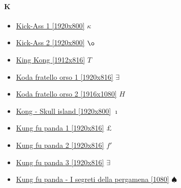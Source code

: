 	\paragraph{K} \hypertarget{FIK}{}
		\begin{itemize}
		
			\item \href{https://mega.nz/#!GEwF1L6R!W4WbCgZw3aRAoZ828tgjJndzR6XEimmqf2Q4RMw4oWI} {Kick-Ass 1 [1920x800]}  $\kappa$ \\ 
			\item \href{https://mega.nz/#!Ykhh1KJB!9V33UqaCIwPpCGVPaE6iOQ09sIMKAzOqsIhYFVmjNm4} {Kick-Ass 2 [1920x800]}  $\o$ \\
			\item \href{https://mega.nz/#!VzwUwBbI!AM4eVGaxxsFD72PdYyLg4AP1rIyJ1kG5UOyUPQO_D70} {King Kong [1912x816]}  $T$ \\
			\item \href{https://mega.nz/#!mr4zya5b!RWvevrKp2qDyORqVVw36BdhZYM0Boinb8SW2wSH-pTc} {Koda fratello orso 1 [1920x816]}  $\exists$ \\
			\item \href{https://mega.nz/#!fwJyAAyQ!Cy4LGoOjiMtzuqDIgj3vuU0gbHM-aa_GD2MlwqR_br0} {Koda fratello orso 2 [1916x1080]}  $H$ \\
			\item \href{https://mega.nz/#!vygSRTxD!46KDE7cMe-eWOofKeW_4zgH-nGmEXDo4a1Sw5aq2-IA} {Kong - Skull island [1920x800]}  $\imath$ \\
			\item \href{https://mega.nz/#!TnBGjDgD!2Cj5VHzMkK8d-JN1TYX_exFPElf9lmODJUn7H05qxxQ} {Kung fu panda 1 [1920x816]}  $\pounds$ \\
			\item \href{https://mega.nz/#!HyxHGKiI!v4WIKM9hrVQsruzz-N1ljUHKWrooZC8sJyPvm-p3_VU} {Kung fu panda 2 [1920x816]}  $f'$ \\
			\item \href{https://mega.nz/#!6vhzFQaQ!I3bFf2VR7BhtZWvQXwZITnNpsdXkEQ2PD93m2mqgAEo} {Kung fu panda 3 [1920x816]}  $\exists$ \\
			\item \href{https://mega.nz/#!WaAyVDZL!fIysxxN8DUSEs5J3bcRacq5P0gxYKL_dh939gEYPKII} {Kung fu panda - I segreti della pergamena [1080]}  $\spadesuit$ \\
		
		\end{itemize}
	

